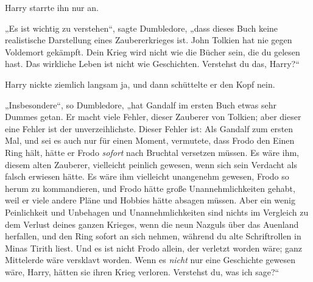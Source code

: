 Harry starrte ihn nur an.

„Es ist wichtig zu verstehen“, sagte Dumbledore, „dass dieses Buch keine realistische Darstellung eines Zaubererkrieges ist. John Tolkien hat nie gegen Voldemort gekämpft. Dein Krieg wird nicht wie die Bücher sein, die du gelesen hast. Das wirkliche Leben ist nicht wie Geschichten. Verstehst du das, Harry?“

Harry nickte ziemlich langsam ja, und dann schüttelte er den Kopf nein.

„Insbesondere“, so Dumbledore, „hat Gandalf im ersten Buch etwas sehr Dummes getan. Er macht viele Fehler, dieser Zauberer von Tolkien; aber dieser eine Fehler ist der unverzeihlichste. Dieser Fehler ist: Als Gandalf zum ersten Mal, und sei es auch nur für einen Moment, vermutete, dass Frodo den Einen Ring hält, hätte er Frodo \emph{sofort} nach Bruchtal versetzen müssen. Es wäre ihm, diesem alten Zauberer, vielleicht peinlich gewesen, wenn sich sein Verdacht als falsch erwiesen hätte. Es wäre ihm vielleicht unangenehm gewesen, Frodo so herum zu kommandieren, und Frodo hätte große Unannehmlichkeiten gehabt, weil er viele andere Pläne und Hobbies hätte absagen müssen. Aber ein wenig Peinlichkeit und Unbehagen und Unannehmlichkeiten sind nichts im Vergleich zu dem Verlust deines ganzen Krieges, wenn die neun Nazguls über das Auenland herfallen, und den Ring sofort an sich nehmen, während du alte Schriftrollen in Minas Tirith liest. Und es ist nicht Frodo allein, der verletzt worden wäre; ganz Mittelerde wäre versklavt worden. Wenn es \emph{nicht} nur eine Geschichte gewesen wäre, Harry, hätten sie ihren Krieg verloren. Verstehst du, was ich sage?“

